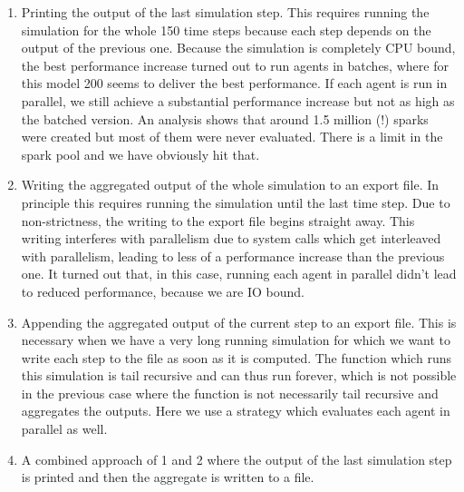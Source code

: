 \begin{enumerate}
	
	\item Printing the output of the last simulation step. This requires running the simulation for the whole 150 time steps because each step depends on the output of the previous one. Because the simulation is completely CPU bound, the best performance increase turned out to run agents in batches, where for this model 200 seems to deliver the best performance. If each agent is run in parallel, we still achieve a substantial performance increase but not as high as the batched version. An analysis shows that around 1.5 million (!) sparks were created but most of them were never evaluated. There is a limit in the spark pool and we have obviously hit that.
	
	\item Writing the aggregated output of the whole simulation to an export file. In principle this requires running the simulation until the last time step. Due to non-strictness, the writing to the export file begins straight away. This writing interferes with parallelism due to system calls which get interleaved with parallelism, leading to less of a performance increase than the previous one. It turned out that, in this case, running each agent in parallel didn't lead to reduced performance, because we are IO bound.
	
	\item Appending the aggregated output of the current step to an export file. This is necessary when we have a very long running simulation for which we want to write each step to the file as soon as it is computed. The function which runs this simulation is tail recursive and can thus run forever, which is not possible in the previous case where the function is not necessarily tail recursive and aggregates the outputs. Here we use a strategy which evaluates each agent in parallel as well.
	
	\item A combined approach of 1 and 2 where the output of the last simulation step is printed and then the aggregate is written to a file.
\end{enumerate}

